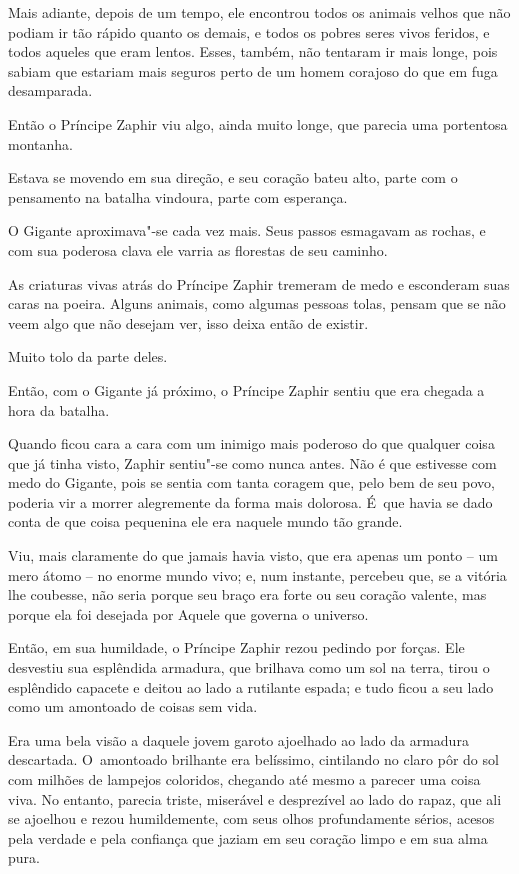 Mais adiante, depois de um tempo, ele encontrou todos os animais velhos
que não podiam ir tão rápido quanto os demais, e todos os pobres seres
vivos feridos, e todos aqueles que eram lentos. Esses, também, não
tentaram ir mais longe, pois sabiam que estariam mais seguros perto de
um homem corajoso do que em fuga desamparada.

Então o Príncipe Zaphir viu algo, ainda muito longe, que parecia uma
portentosa montanha.

Estava se movendo em sua direção, e seu coração bateu alto, parte com o
pensamento na batalha vindoura, parte com esperança.

O Gigante aproximava"-se cada vez mais. Seus passos esmagavam as rochas,
e com sua poderosa clava ele varria as florestas de seu caminho.

As criaturas vivas atrás do Príncipe Zaphir tremeram de medo e
esconderam suas caras na poeira. Alguns animais, como algumas pessoas
tolas, pensam que se não veem algo que não desejam ver, isso deixa então
de existir.

Muito tolo da parte deles.

Então, com o Gigante já próximo, o Príncipe Zaphir sentiu que era
chegada a hora da batalha.



Quando ficou cara a cara com um inimigo mais poderoso do que qualquer
coisa que já tinha visto, Zaphir sentiu"-se como nunca antes. Não é que
estivesse com medo do Gigante, pois se sentia com tanta coragem que,
pelo bem de seu povo, poderia vir a morrer alegremente da forma mais
dolorosa. É~que havia se dado conta de que coisa pequenina ele era
naquele mundo tão grande.

Viu, mais claramente do que jamais havia visto, que era apenas um ponto
-- um mero átomo -- no enorme mundo vivo; e, num instante, percebeu que,
se a vitória lhe coubesse, não seria porque seu braço era forte ou seu
coração valente, mas porque ela foi desejada por Aquele que governa o
universo.

Então, em sua humildade, o Príncipe Zaphir rezou pedindo por forças. Ele
desvestiu sua esplêndida armadura, que brilhava como um sol na terra,
tirou o esplêndido capacete e deitou ao lado a rutilante espada; e tudo
ficou a seu lado como um amontoado de coisas sem vida.

Era uma bela visão a daquele jovem garoto ajoelhado ao lado da armadura
descartada. O~amontoado brilhante era belíssimo, cintilando no claro pôr
do sol com milhões de lampejos coloridos, chegando até mesmo a parecer
uma coisa viva. No entanto, parecia triste, miserável e desprezível ao lado
do rapaz, que ali se ajoelhou e rezou humildemente, com seus olhos
profundamente sérios, acesos pela verdade e pela confiança que jaziam em
seu coração limpo e em sua alma pura.

